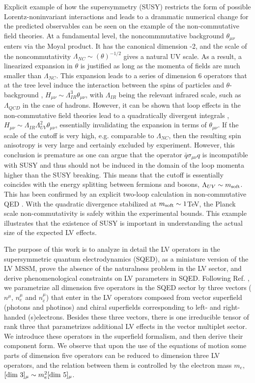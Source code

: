 \documentclass[paper,12pt]{revtex4}
\begin{document}
Explicit example of how the supersymmetry (SUSY) restricts the form of possible 
Lorentz-noninvariant interactions and leads to a drammatic numerical change 
for the predicted observables can be seen on the example of the non-commutative 
field theories.  At a fundamental level, the noncommmutative background 
$\theta_{\mu\nu}$ enters via the Moyal product. It has the canonical 
dimension -2, and the scale of the noncommutativity $\Lambda_{NC}
\sim(\theta)^{-1/2}$ gives a natural UV scale. 
As a result, a linearized expansion in $\theta$ is justified 
as long as the momenta of fields  are much smaller than $\Lambda_{NC}$. 
This expansion leads to a series of dimension 6 operators
that at the tree level induce the interaction between the spins of 
particles and $\theta$-background \cite{MPR1}, $H_{\mu\nu} \sim \Lambda_{IR}^3\theta_{\mu\nu}$,
with $ \Lambda_{IR}$ being the relevant infrared scale, such as $\Lambda_{QCD}$ 
in the case of hadrons. However, it can be shown that loop effects in the 
non-commutative field theories lead to a quadratically divergent integrals \cite{UCSC},
$H_{\mu\nu} \sim \Lambda_{IR}\Lambda_{UV}^2\theta_{\mu\nu}$, essentially
invalidating the expansion in terms of $\theta_{\mu\nu}$. 
If the scale of the cutoff is very high, e.g. comparable to $\Lambda_{NC}$, 
then the resulting spin anisotropy is very large and certainly excluded 
by experiment. However, this conclusion is premature as 
one can argue that the operator $\bar q \sigma_{\mu\nu} q$ 
is incompatible with SUSY \cite{MPR2} and thus should not be induced 
in the domain of the loop momenta higher than the SUSY breaking. 
This means that the cutoff is essentially coincides with the 
energy splitting between fermions and bosons, $\Lambda_{UV} \sim m_{\rm soft}$. 
This has been confirmed by an explicit two-loop calculation in non-commutative 
QED \cite{WMC2}. With the quadratic divergence stabilized at $m_{\rm soft}\sim 1 $TeV,
the Planck scale non-commutativity is safely within the experimental 
bounds. This example illustrates that the existence of SUSY is important in 
understanding the actual size of the expected LV effects. 

The purpose of this work is to analyze in detail the LV operators in 
the supersymmetric quantum electrodynamics (SQED),
as a miniature version of the LV MSSM, prove the absence of the naturalness problem in the 
LV sector, and derive phenomenological constraints on LV parameters in SQED. 
Following Ref. \cite{GrootNibbelink:2004za}, we  parametrize all dimension five operators 
in the SQED sector  by three vectors ($n^{\mu}$, $n^{\mu}_{e}$ and 
$n^{\mu}_{\bar e}$) that enter in the LV operators composed 
from vector superfield (photons and photinos) and chiral superfields corresponding to 
left- and right-handed (s)electrons. 
Besides these three vectors, there is one irreducible tensor of rank three 
that parametrizes additional LV effects in the vector multiplet sector. 
We introduce these operators in the superfield formalism, 
and then derive their component form. We observe that upon the use of the equations of motion 
some parts of dimension five operators can be reduced to dimension three LV operators, and the relation 
between them is controlled by the electron mass $m_e$,  
$[{\rm dim}~3]_{\mu} \sim m_e^2 [{\rm dim}~5]_{\mu}$.
\end{document}
